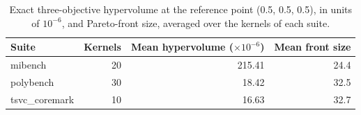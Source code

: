 \begin{table}[t]
\centering
\caption{Exact three-objective hypervolume at the reference point (0.5, 0.5, 0.5), in units of $10^{-6}$, and Pareto-front size, averaged over the kernels of each suite.}
\label{tab:pareto}
\setlength{\tabcolsep}{3pt}
\begin{tabular}{|l|r|r|r|}
\hline
Suite & Kernels & Mean hypervolume ($\times10^{-6}$) & Mean front size \\
\hline
mibench & 20 & 215.41 & 24.4 \\
\hline
polybench & 30 & 18.42 & 32.5 \\
\hline
tsvc\_coremark & 10 & 16.63 & 32.7 \\
\hline
\end{tabular}
\end{table}
